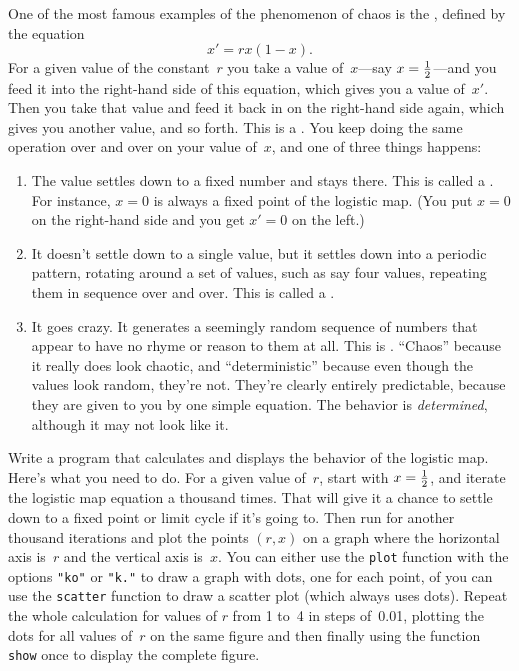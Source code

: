 \documentclass[12pt]{article}
\begin{document}
\begin{exercises}
\exskip One of the most famous examples of the phenomenon of chaos is the
, defined by the equation
\begin{equation}
x' = rx(1-x).
\end{equation}
For a given value of the constant~$r$ you take a value of~$x$---say
$x=\tfrac12$---and you feed it into the right-hand side of this equation,
which gives you a value of~$x'$.  Then you take that value and feed it back
in on the right-hand side again, which gives you another value, and so
forth.  This is a .  You keep doing the same
operation over and over on your value of~$x$, and one of three things
happens: {\renewcommand{\labelenumi}{\arabic{enumi}.\ }
\begin{enumerate}\setlength{\itemsep}{0pt}
\item The value settles down to a fixed number and stays there.  This is
  called a .  For instance, $x=0$ is always a
  fixed point of the logistic map.  (You put $x=0$ on the right-hand side
  and you get $x'=0$ on the left.)
\item It doesn't settle down to a single value, but it settles down into a
  periodic pattern, rotating around a set of values, such as say four
  values, repeating them in sequence over and over.  This is called a
  .
\item It goes crazy.  It generates a seemingly random sequence of numbers
  that appear to have no rhyme or reason to them at all.  This is
  .  ``Chaos'' because it really does look
  chaotic, and ``deterministic'' because even though the values look
  random, they're not.  They're clearly entirely predictable, because they
  are given to you by one simple equation.  The behavior is
  \emph{determined}, although it may not look like it.
\end{enumerate}}
Write a program that calculates and displays the behavior of the logistic
map.  Here's what you need to do.  For a given value of~$r$, start with
$x=\tfrac12$, and iterate the logistic map equation a thousand times.  That
will give it a chance to settle down to a fixed point or limit cycle if
it's going to.  Then run for another thousand iterations and plot the
points $(r,x)$ on a graph where the horizontal axis is~$r$ and the vertical
axis is~$x$.  You can either use the \verb|plot| function with the options
\verb|"ko"| or \verb|"k."| to draw a graph with dots, one for each point,
of you can use the \verb|scatter| function to draw a scatter plot (which
always uses dots).  Repeat the whole calculation for values of $r$ from 1
to~4 in steps of~0.01, plotting the dots for all values of~$r$ on the same
figure and then finally using the function \verb|show| once to display the
complete figure.


\end{exercises}
\end{document}
